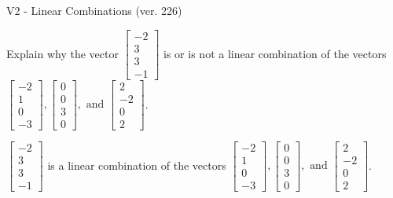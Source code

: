 \begin{exercise}
  \begin{exerciseTitle}V2 - Linear Combinations (ver. 226)\end{exerciseTitle}
  \begin{exerciseStatement}
    Explain why the vector \(\left[\begin{array}{c}
-2 \\
3 \\
3 \\
-1
\end{array}\right]\)  is or is not a linear 
	combination of the vectors \(\left[\begin{array}{c}
-2 \\
1 \\
0 \\
-3
\end{array}\right] , \left[\begin{array}{c}
0 \\
0 \\
3 \\
0
\end{array}\right] , \text{ and } \left[\begin{array}{c}
2 \\
-2 \\
0 \\
2
\end{array}\right]\).
	


  \end{exerciseStatement}
  \begin{exerciseAnswer}
   \(\left[\begin{array}{c}
-2 \\
3 \\
3 \\
-1
\end{array}\right]\) 
  	 is  
	a linear combination of the vectors \(\left[\begin{array}{c}
-2 \\
1 \\
0 \\
-3
\end{array}\right] , \left[\begin{array}{c}
0 \\
0 \\
3 \\
0
\end{array}\right] , \text{ and } \left[\begin{array}{c}
2 \\
-2 \\
0 \\
2
\end{array}\right]\).

	
  


  \end{exerciseAnswer}
\end{exercise}